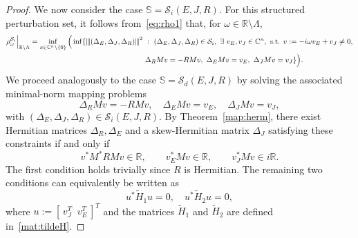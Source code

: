 \documentclass[11pt]{article}
\newcommand{\R}{\mathbb R}
\newcommand{\C}{\mathbb C}
\newcommand{\nnrm}[1]{{\left\vert\kern-0.25ex\left\vert\kern-0.25ex\left\vert #1
		\right\vert\kern-0.25ex\right\vert\kern-0.25ex\right\vert}}
\begin{document}
\begin{proof}
    We now consider the case $\mathbb S = \mathcal S_i(E,J,R)$. For this structured perturbation set, it follows from~\eqref{eq:rho1} that, for $\omega \in \mathbb{R}\setminus\Lambda$,
    \begin{align}
        \rho_\omega^{\mathcal S_i}\Big|_{\R\setminus \Lambda}&= \inf_{x\in \C^{n}\setminus \{0\}}\Big(\inf\{\nnrm{(\Delta_E,\Delta_J,\Delta_R)}^2~:~(\Delta_E,\Delta_J,\Delta_R)\in \mathcal S_i,~\exists~v_E,v_J\in \C^{n}, \text{ s.t. } v:=-i\omega v_E+v_J\neq 0,\nonumber\\
        & \hspace{5.5cm}\Delta_RM v= -RM v,~\Delta_EM v=v_E,~\Delta_JM v=v_J\} \Big).\label{eq:rho3}
    \end{align}
    We proceed analogously to the case $\mathbb S=\mathcal S_d(E,J,R)$ by solving the associated minimal-norm mapping problems
    \begin{equation*}
        \Delta_R M v = - R M v, \quad
    \Delta_E M v = v_E, \quad
    \Delta_J M v = v_J,
    \end{equation*}
    with $(\Delta_E,\Delta_J,\Delta_R)\in \mathcal S_i(E,J,R)$. By Theorem~\ref{map:herm}, there exist Hermitian matrices $\Delta_R,\Delta_E$ and a skew-Hermitian matrix $\Delta_J$ %
    satisfying these constraints if and only if
    \begin{equation*}
        v^* M^* R M v \in \mathbb{R}, \qquad v_E^* M v \in \mathbb{R}, \qquad v_J^* M v \in i\mathbb{R}.
    \end{equation*}
    The first condition holds trivially since $R$ is Hermitian. The remaining two conditions can equivalently be written as
    \begin{equation*}
        u^* \tilde H_1 u = 0, \quad u^* \tilde H_2 u = 0,
    \end{equation*}
    where $u := [\, v_J^T \;\; v_E^T \,]^T$ and the matrices $\tilde H_1$ and
    $\tilde H_2$ are defined in~\eqref{mat:tildeH}.


\end{proof}
\end{document}
